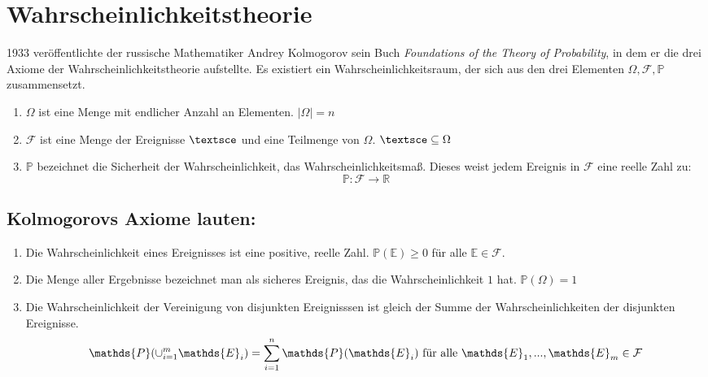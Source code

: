 \documentclass{article}
\begin{document}
\section *{Wahrscheinlichkeitstheorie}


\vspace{15pt}


1933 ver\"offentlichte der russische Mathematiker Andrey Kolmogorov sein Buch \textit{Foundations of the Theory of Probability}, in dem er die drei Axiome der Wahrscheinlichkeitstheorie aufstellte. Es existiert ein Wahrscheinlichkeitsraum, der sich aus den drei Elementen $\Omega, \mathcal{F}, \mathds{P}$ zusammensetzt.

\vspace{5pt}

\begin{enumerate}
	\item $\Omega$ ist eine Menge mit endlicher Anzahl an Elementen. $|\Omega|= n $
	\item $\mathcal{F}$ ist eine Menge der Ereignisse $\textsce $ und eine Teilmenge von $\Omega$. $\textsce \subseteq \Omega$
	\item $\mathds{P}$ bezeichnet die Sicherheit der Wahrscheinlichkeit, das Wahrscheinlichkeitsmaß. Dieses weist jedem Ereignis in $\mathcal{F}$ eine reelle Zahl zu: 
	\begin{equation*} 
	\mathds{P}: \mathcal{F} \longrightarrow \mathds{R}
	\end{equation*}
	
\end{enumerate}

\vspace{10pt}



\subsection *{Kolmogorovs Axiome lauten:}

\vspace{5pt}

\begin{enumerate}
	\item Die Wahrscheinlichkeit eines Ereignisses ist eine positive, reelle Zahl. $\mathds{P} (\mathds{E}) \geq 0$ f\"ur alle $\mathds{E} \in \mathcal{F}$.
	\item Die Menge aller Ergebnisse bezeichnet man als sicheres Ereignis, das die Wahrscheinlichkeit $1$ hat. $\mathds{P} (\Omega) = 1$
	\item Die Wahrscheinlichkeit der Vereinigung von disjunkten Ereignisssen ist gleich der Summe der Wahrscheinlichkeiten der disjunkten Ereignisse. 
	\vspace{3pt}
	\begin{equation*}
	\mathds{P} (\cup_{i=1}^m \mathds{E}_{i}) = \sum_{i=1}^n \mathds{P} (\mathds{E}_{i})$ f\"ur alle $\mathds{E}_{1},...,\mathds{E}_{m} \in \mathcal{F}
	\end{equation*}
\end{enumerate}
\vspace{5pt}
\end{document}
